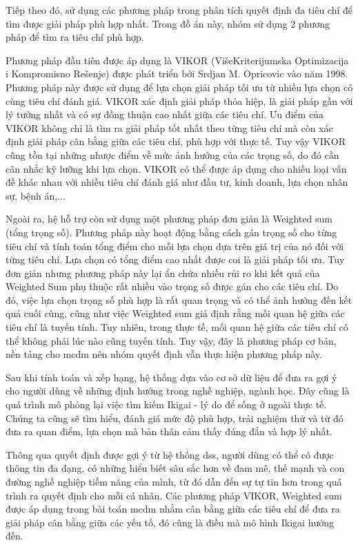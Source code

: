     Tiếp theo đó, sử dụng các phương pháp trong phân tích quyết định đa tiêu chí để tìm được giải pháp phù hợp nhất. Trong đồ án này, nhóm sử dụng 2 phương pháp để tìm ra tiêu chí phù hợp.
    
    Phương pháp đầu tiên được áp dụng là VIKOR (VišeKriterijumska Optimizacija i Kompromisno Rešenje) được phát triển bởi Srdjan M. Opricovic vào năm 1998. Phương pháp này được sử dụng để lựa chọn giải pháp tối ưu từ nhiều lựa chọn có cùng tiêu chí đánh giá. VIKOR xác định giải pháp thỏa hiệp, là giải pháp gần với lý tưởng nhất và có sự đồng thuận cao nhất giữa các tiêu chí. Ưu điểm của VIKOR không chỉ là tìm ra giải pháp tốt nhất theo từng tiêu chí mà còn xác định giải pháp cân bằng giữa các tiêu chí, phù hợp với thực tế. Tuy vậy VIKOR cũng tồn tại những nhược điểm về mức ảnh hưởng của các trọng số, do đó cần cân nhắc kỹ lưỡng khi lựa chọn. VIKOR có thể được áp dụng cho nhiều loại vấn đề khác nhau với nhiều tiêu chí đánh giá như đầu tư, kinh doanh, lựa chọn nhân sự, bệnh án,...

    Ngoài ra, hệ hỗ trợ còn sử dụng một phương pháp đơn giản là Weighted sum (tổng trọng số). Phương pháp này hoạt động bằng cách gán trọng số cho từng tiêu chí và tính toán tổng điểm cho mỗi lựa chọn dựa trên giá trị của nó đối với từng tiêu chí. Lựa chọn có tổng điểm cao nhất được coi là giải pháp tối ưu. Tuy đơn giản nhưng phương pháp này lại ẩn chứa nhiều rủi ro khi kết quả của Weighted Sum phụ thuộc rất nhiều vào trọng số được gán cho các tiêu chí. Do đó, việc lựa chọn trọng số phù hợp là rất quan trọng và có thể ảnh hưởng đến kết quả cuối cùng, cũng như việc Weighted sum giả định rằng mối quan hệ giữa các tiêu chí là tuyến tính. Tuy nhiên, trong thực tế, mối quan hệ giữa các tiêu chí có thể không phải lúc nào cũng tuyến tính. Tuy vậy, đây là phương pháp cơ bản, nền tảng cho \acrshort{mcdm} nên nhóm quyết định vẫn thực hiện phương pháp này.
    
    Sau khi tính toán và xếp hạng, hệ thống dựa vào cơ sở dữ liệu để đưa ra gợi ý cho người dùng về những định hướng trong nghề nghiệp, ngành học. Đây cũng là quá trình mô phỏng lại việc tìm kiếm Ikigai - lý do để sống ở ngoài thực tế. Chúng ta cũng sẽ tìm hiểu, đánh giá mức độ phù hợp, trải nghiệm thử và từ đó đưa ra quan điểm, lựa chọn mà bản thân cảm thấy đúng đắn và hợp lý nhất.
    
    Thông qua quyết định được gợi ý từ hệ thống \acrshort{dss}, người dùng có thể có được thông tin đa dạng, có những hiểu biết sâu sắc hơn về đam mê, thế mạnh và con đường nghề nghiệp tiềm năng của mình, từ đó dẫn đến sự tự tin hơn trong quá trình ra quyết định cho mỗi cá nhân. Các phương pháp VIKOR, Weighted sum được áp dụng trong bài toán \acrshort{mcdm} nhằm cân bằng giữa các tiêu chí để đưa ra giải pháp cân bằng giữa các yếu tố, đó cũng là điều mà mô hình Ikigai hướng đến.